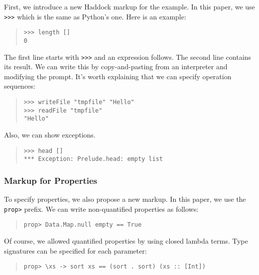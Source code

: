 \documentclass[preprint]{sigplanconf}
\begin{document}
\noindent First, we introduce a new Haddock markup for the example.
In this paper, we use {\tt >>>} which is the same as Python's one.
Here is an example:

\begin{quote}
\small
\begin{verbatim}
>>> length []
0
\end{verbatim}
\end{quote}

\noindent The first line starts with {\tt >>>} and an expression follows. The second line contains its result. We can write this by copy-and-pasting from an interpreter and modifying the prompt.
It's worth explaining that we can specify operation sequences:

\begin{quote}
\small
\begin{verbatim}
>>> writeFile "tmpfile" "Hello"
>>> readFile "tmpfile"
"Hello"
\end{verbatim}
\end{quote}

\noindent Also, we can show exceptions.

\begin{quote}
\small
\begin{verbatim}
>>> head []
*** Exception: Prelude.head: empty list
\end{verbatim}
\end{quote}

\subsubsection{Markup for Properties}

\noindent To specify properties, we also propose a new markup. In this paper, we
use the {\tt prop>} prefix. We can write non-quantified properties as follows:

\begin{quote}
\small
\begin{verbatim}
prop> Data.Map.null empty == True
\end{verbatim}
\end{quote}

\noindent Of course, we allowed quantified properties by using closed
lambda terms.
Type signatures can be specified for each parameter:

\begin{quote}
\small
\begin{verbatim}
prop> \xs -> sort xs == (sort . sort) (xs :: [Int])
\end{verbatim}
\end{quote}
\end{document}
